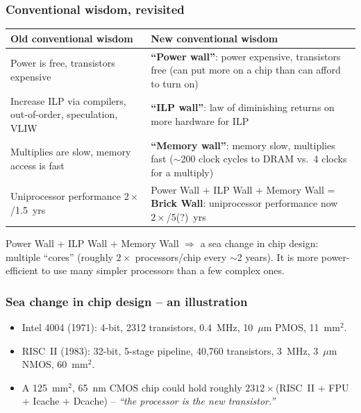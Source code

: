 \subsubsection{Conventional wisdom, revisited}
\begin{center}
\begin{tabular}{@{}p{6.6cm}p{6.6cm}@{}}
\toprule
Old conventional wisdom & New conventional wisdom \\
\midrule
Power is free, transistors expensive &
\textbf{``Power wall''}: power expensive, transistors free (can put more on
a chip than can afford to turn on) \\
Increase ILP via compilers, out-of-order, speculation, VLIW &
\textbf{``ILP wall''}: law of diminishing returns on more hardware for ILP \\
Multiplies are slow, memory access is fast &
\textbf{``Memory wall''}: memory slow, multiplies fast ($\sim$200 clock
cycles to DRAM vs.\ 4 clocks for a multiply) \\
Uniprocessor performance $2\times$/1.5~yrs &
Power Wall + ILP Wall + Memory Wall = \textbf{Brick Wall}: uniprocessor
performance now $2\times$/5(?)~yrs \\
\bottomrule
\end{tabular}
\end{center}
\begin{note}
Power Wall + ILP Wall + Memory Wall $\Rightarrow$ a sea change in chip
design: multiple ``cores'' (roughly $2\times$ processors/chip every $\sim$2
years). It is more power-efficient to use many simpler processors than a few
complex ones.
\end{note}

\subsubsection{Sea change in chip design -- an illustration}
\begin{itemize}
  \item Intel 4004 (1971): 4-bit, 2312 transistors, 0.4~MHz, 10~$\mu$m PMOS,
  11~mm$^2$.
  \item RISC~II (1983): 32-bit, 5-stage pipeline, 40{,}760 transistors,
  3~MHz, 3~$\mu$m NMOS, 60~mm$^2$.
  \item A 125~mm$^2$, 65~nm CMOS chip could hold roughly
  $2312\times$(RISC~II + FPU + Icache + Dcache) -- \emph{``the processor is
  the new transistor.''}
\end{itemize}


